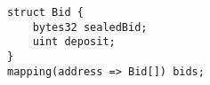 \begin{lstlisting}
struct Bid {
	bytes32 sealedBid;
	uint deposit;
}
mapping(address => Bid[]) bids;	
\end{lstlisting}